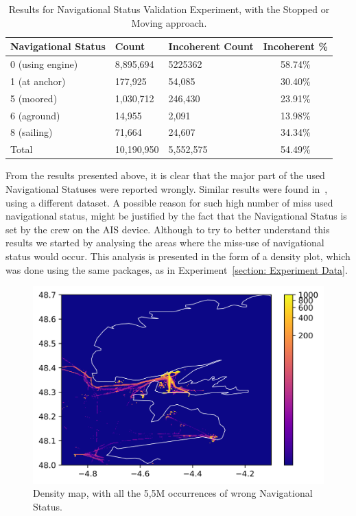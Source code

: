 \begin{table}[H]
\centering
\caption{Results for Navigational Status Validation Experiment, with the Stopped or Moving approach. }
\label{Table: 5 Status Results}
\begin{tabular}{@{}lllc@{}}
\toprule
Navigational Status & Count & Incoherent Count & Incoherent \% \\ \midrule
0 (using engine) & 8,895,694 & 5225362 & 58.74\% \\
1 (at anchor) & 177,925 & 54,085 & 30.40\% \\
5 (moored) & 1,030,712 & 246,430 & 23.91\% \\
6 (aground) & 14,955 & 2,091 & 13.98\% \\
8 (sailing) & 71,664 & 24,607 & 34.34\% \\
Total & 10,190,950 & 5,552,575 & 54.49\% \\ \bottomrule
\end{tabular}
\end{table}

From the results presented above, it is clear that the major part of the used Navigational Statuses were reported wrongly. Similar results were found in~\cite{Machado2019VesselOutliers}, using a different dataset. A possible reason for such high number of miss used navigational status, might be justified by the fact that the Navigational Status is set by the crew on the AIS device. 
Although to try to better understand this results we started by analysing the areas where the miss-use of navigational status would occur. This analysis is presented in the form of a density plot, which was done using the same packages, as in Experiment~\ref{section: Experiment Data}.

\begin{figure}[H]
	\centering
	\includegraphics[width=\textwidth]{figures/Ch5/ThesisExpStatusDensityZoom.png}
    \caption{Density map, with all the 5,5M occurrences of wrong Navigational Status.}
    \label{fig: 5 Exp StatusDensityMap}
\end{figure}

